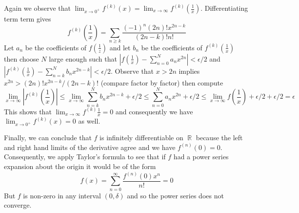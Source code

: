 \documentclass{article}
\DeclareMathOperator{\R}{\mathbb{R}}
\begin{document}
Again we observe that $\lim_{x \to 0^+} f^{(k)}(x) = \lim_{x\to\infty}
f^{(k)}(\frac{1}{x})$. Differentiating term term gives
\[
f^{(k)}\left(\frac{1}{x}\right) = \sum_{n\geq
  k}\frac{(-1)^n(2n)!x^{2n-k}}{(2n-k)!n!}
\]
Let $a_n$ be the coefficients of $f(\frac{1}{z})$ and let $b_n$ be the
coefficients of $f^{(k)}(\frac{1}{x})$ then choose $N$ large enough
such that $|f(\frac{1}{x}) - \sum_{n=0}^N a_nx^{2n}| < \epsilon/2$ and
$|f^{(k)}(\frac{1}{x}) - \sum_{n=k}^N b_nx^{2n-k}| <
\epsilon/2$. Observe that $x > 2n$ implies $x^{2n} >
(2n)!x^{2n-k}/(2n-k)!$ (compare factor by factor) then compute
\[
\lim_{x\to\infty} \left|f^{(k)}\left(\frac{1}{x}\right)\right| \leq
\lim_{x\to\infty} \sum_{n=k}^N b_nx^{2n-k} + \epsilon/2 \leq
\sum_{n=0}^N a_nx^{2n} + \epsilon/2 \leq
\lim_{x\to\infty}f\left(\frac{1}{x}\right) + \epsilon/2 + \epsilon/2 =
\epsilon
\]
This shows that $\lim_{x\to\infty} f^{(k)}{\frac{1}{x}} = 0$ and
consequently we have $\lim_{x\to 0^+} f^{(k)}(x) = 0$ as well.

Finally, we can conclude that $f$ is infinitely differentiable on $\R$
because the left and right hand limits of the derivative agree and we
have $f^{(n)}(0) = 0$. Consequently, we apply Taylor's formula to see
that if $f$ had a power series expansion about the origin it would be
of the form
\[
f(x) = \sum_{n=0}^\infty \frac{f^{(n)}(0)x^n}{n!} = 0
\]
But $f$ is non-zero in any interval $(0,\delta)$ and so the power
series does not converge.
\end{document}
